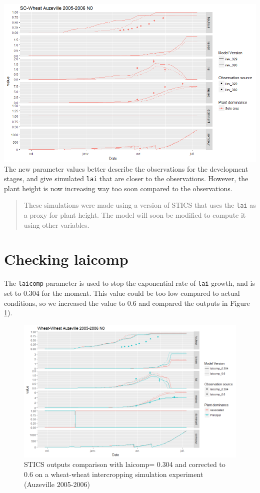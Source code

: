 \documentclass[
]{book}
\begin{document}
\includegraphics{img/ilevSC.png}
The new parameter values better describe the observations for the development stages, and give simulated \texttt{lai} that are closer to the observations. However, the plant height is now increasing way too soon compared to the observations.

\begin{quote}
These simulations were made using a version of STICS that uses the \texttt{lai} as a proxy for plant height. The model will soon be modified to compute it using other variables.
\end{quote}

\hypertarget{checking-laicomp}{%
\section{Checking laicomp}\label{checking-laicomp}}

The \texttt{laicomp} parameter is used to stop the exponential rate of \texttt{lai} growth, and is set to 0.304 for the moment.
This value could be too low compared to actual conditions, so we increased the value to 0.6 and compared the outputs in Figure \ref{fig:laicomp}).

\begin{figure}
\centering
\includegraphics{img/laicomp.png}
\caption{\label{fig:laicomp}STICS outputs comparison with laicomp= 0.304 and corrected to 0.6 on a wheat-wheat intercropping simulation experiment (Auzeville 2005-2006)}
\end{figure}
\end{document}
